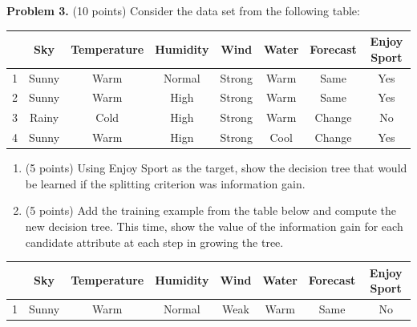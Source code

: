 \documentclass[twoside]{article}
\begin{document}

\textbf{Problem 3.} (10 points) Consider the data set from the following table:

\begin{tabular}{|c|c|c|c|c|c|c|c|}
\hline 
 & Sky & Temperature & Humidity & Wind & Water & Forecast & Enjoy Sport\tabularnewline
\hline 
\hline 
1 & Sunny & Warm & Normal & Strong & Warm & Same & Yes\tabularnewline
\hline 
2 & Sunny & Warm & High & Strong & Warm & Same & Yes\tabularnewline
\hline 
3 & Rainy & Cold & High & Strong & Warm & Change & No\tabularnewline
\hline 
4 & Sunny & Warm & Hign & Strong & Cool & Change & Yes\tabularnewline
\hline 
\end{tabular}

\begin{enumerate}
\item (5 points) Using Enjoy Sport as the target, show the decision tree that would be learned if the splitting criterion was information gain.
\item (5 points) Add the training example from the table below and compute the new decision tree. This time, show the value of the information gain for each candidate attribute at each step in growing the tree.
\end{enumerate}

\begin{tabular}{|c|c|c|c|c|c|c|c|}
\hline 
 & Sky & Temperature & Humidity & Wind & Water & Forecast & Enjoy Sport\tabularnewline
\hline 
\hline 
1 & Sunny & Warm & Normal & Weak & Warm & Same & No\tabularnewline
\hline 
\end{tabular}

\vspace{1em}
\end{document}
